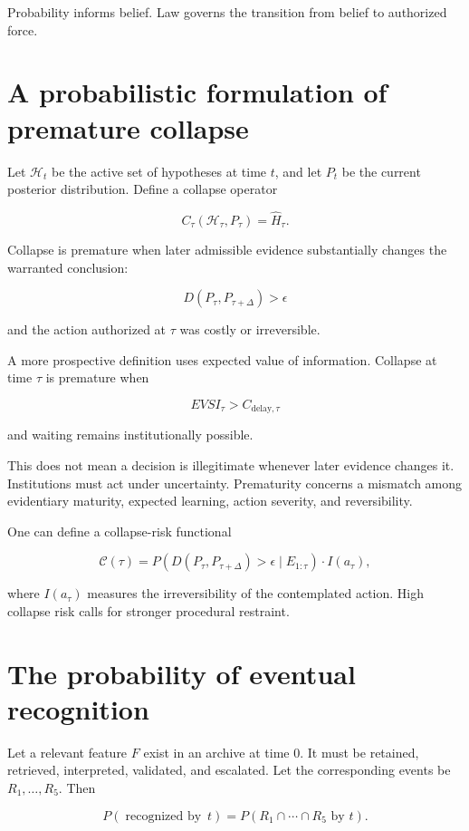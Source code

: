Probability informs belief. Law governs the transition from belief to authorized force.

\section{A probabilistic formulation of premature collapse}
\label{sec:a57}

Let \(\mathcal H_t\) be the active set of hypotheses at time \(t\), and let \(P_t\) be the current posterior distribution. Define a collapse operator

\[
C_\tau(\mathcal H_\tau,P_\tau)=\widehat H_\tau.
\]

Collapse is premature when later admissible evidence substantially changes the warranted conclusion:

\[
D\left(
P_\tau,
P_{\tau+\Delta}
\right)>\epsilon
\]

and the action authorized at \(\tau\) was costly or irreversible.

A more prospective definition uses expected value of information. Collapse at time \(\tau\) is premature when

\[
EVSI_\tau
>
C_{\mathrm{delay},\tau}
\]

and waiting remains institutionally possible.

This does not mean a decision is illegitimate whenever later evidence changes it. Institutions must act under uncertainty. Prematurity concerns a mismatch among evidentiary maturity, expected learning, action severity, and reversibility.

One can define a collapse-risk functional

\[
\mathcal C(\tau)
=
P\!\left(
D(P_\tau,P_{\tau+\Delta})>\epsilon
\mid E_{1:\tau}
\right)
\cdot
I(a_\tau),
\]

where \(I(a_\tau)\) measures the irreversibility of the contemplated action. High collapse risk calls for stronger procedural restraint.

\section{The probability of eventual recognition}
\label{sec:a58}

Let a relevant feature \(F\) exist in an archive at time \(0\). It must be retained, retrieved, interpreted, validated, and escalated. Let the corresponding events be \(R_1,\ldots,R_5\). Then

\[
P(\operatorname{recognized\ by}\ t)
=
P(R_1\cap\cdots\cap R_5\text{ by }t).
\]

